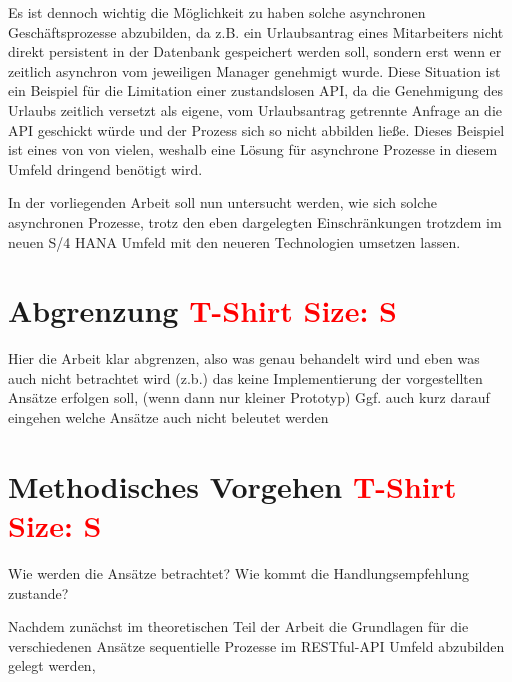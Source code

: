 Es ist dennoch wichtig die Möglichkeit zu haben solche asynchronen Geschäftsprozesse abzubilden, da z.B. ein Urlaubsantrag eines Mitarbeiters nicht direkt persistent in der Datenbank gespeichert werden soll, sondern erst wenn er zeitlich asynchron vom jeweiligen Manager genehmigt wurde. Diese Situation ist ein Beispiel für die Limitation einer zustandslosen API, da die Genehmigung des Urlaubs zeitlich versetzt als eigene, vom Urlaubsantrag getrennte Anfrage an die API geschickt würde und der Prozess sich so nicht abbilden ließe. Dieses Beispiel ist eines von von vielen, weshalb eine Lösung für asynchrone Prozesse in diesem Umfeld dringend benötigt wird.  

In der vorliegenden Arbeit soll nun untersucht werden, wie sich solche asynchronen Prozesse, trotz den eben dargelegten Einschränkungen trotzdem im neuen S/4 HANA Umfeld mit den neueren Technologien umsetzen lassen.



\section{Abgrenzung \textcolor{red}{T-Shirt Size: S}}

Hier die Arbeit klar abgrenzen, also was genau behandelt wird und eben was auch nicht betrachtet wird (z.b.) das keine Implementierung der vorgestellten Ansätze erfolgen soll, (wenn dann nur kleiner Prototyp)
Ggf. auch kurz darauf eingehen welche Ansätze auch nicht beleutet werden



\section{Methodisches Vorgehen \textcolor{red}{T-Shirt Size: S}}

Wie werden die Ansätze betrachtet? Wie kommt die Handlungsempfehlung zustande?

Nachdem zunächst im theoretischen Teil der Arbeit die Grundlagen für die verschiedenen Ansätze sequentielle Prozesse im RESTful-API Umfeld abzubilden gelegt werden, 